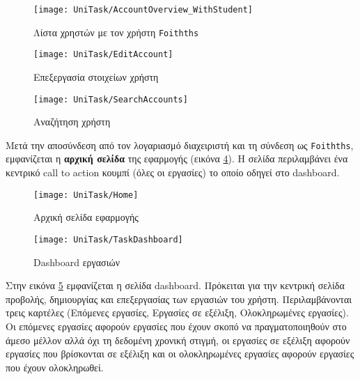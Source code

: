         \begin{figure}[h!] \noindent \centering
            \texttt{[image: UniTask/AccountOverview\_WithStudent]}
            \caption{\centering Λίστα χρηστών με τον χρήστη \texttt{Foithths}}
            \label{fig:unitask_AccountOverview_WithStudent}
        \end{figure}

        \begin{figure}[h!] \noindent \centering
            \texttt{[image: UniTask/EditAccount]}
            \caption{\centering Επεξεργασία στοιχείων χρήστη}
            \label{fig:unitask_EditAccount}
        \end{figure}

        \begin{figure}[h!] \noindent \centering
            \texttt{[image: UniTask/SearchAccounts]}
            \caption{\centering Αναζήτηση χρήστη}
            \label{fig:unitask_SearchAccounts}
        \end{figure}

        Μετά την αποσύνδεση από τον λογαριασμό διαχειριστή και τη σύνδεση ως \texttt{Foithths}, εμφανίζεται η \textbf{αρχική σελίδα} της εφαρμογής (εικόνα \ref{fig:unitask_Home}). Η σελίδα περιλαμβάνει ένα κεντρικό call to action κουμπί ({\Zona όλες οι εργασίες}) το οποίο οδηγεί στο {\Zona dashboard}.

        \begin{figure}[h!] \noindent \centering
            \texttt{[image: UniTask/Home]}
            \caption{\centering Αρχική σελίδα εφαρμογής}
            \label{fig:unitask_Home}
        \end{figure}

        \begin{figure}[h!] \noindent \centering
            \texttt{[image: UniTask/TaskDashboard]}
            \caption{\centering Dashboard εργασιών}
            \label{fig:unitask_TaskDashboard}
        \end{figure}

        Στην εικόνα \ref{fig:unitask_TaskDashboard} εμφανίζεται η σελίδα {\ZonaSB dashboard}. Πρόκειται για την κεντρική σελίδα προβολής, δημιουργίας και επεξεργασίας των εργασιών του χρήστη. Περιλαμβάνονται τρεις καρτέλες ({\Zona Επόμενες εργασίες}, {\Zona Εργασίες σε εξέλιξη}, {\Zona Ολοκληρωμένες εργασίες}). Οι επόμενες εργασίες αφορούν εργασίες που έχουν σκοπό να πραγματοποιηθούν στο άμεσο μέλλον αλλά όχι τη δεδομένη χρονική στιγμή, οι εργασίες σε εξέλιξη αφορούν εργασίες που βρίσκονται σε εξέλιξη και οι ολοκληρωμένες εργασίες αφορούν εργασίες που έχουν ολοκληρωθεί.

